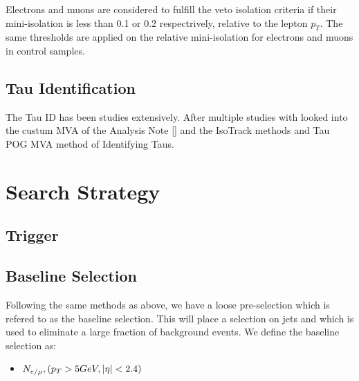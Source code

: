  Electrons and muons are considered to fulfill the veto isolation criteria if their mini-isolation is less than 0.1 or 0.2 respectrively, relative to the lepton $p_T$. The same thresholds are applied on the relative mini-isolation for electrons and muons in control samples. 
 
\subsection{Tau Identification}\label{TauID}
The Tau ID has been studies extensively. After multiple studies with looked into the custum MVA of the Analysis Note [] and the IsoTrack methods and Tau POG MVA method of Identifying Taus. 

\section{Search Strategy}\label{BaselineSearch}
\subsection{Trigger}


\subsection{Baseline Selection} \label{Baseline}

Following the same methods as above, we have a loose pre-selection which is refered to as the baseline selection. This will place a selection on jets and \met which is used to eliminate a large fraction of background events. We define the baseline selection as:

\begin{itemize}
	\item $N_{e/\mu}, (p_T>5 GeV, |\eta|<2.4)$
\end{itemize}

